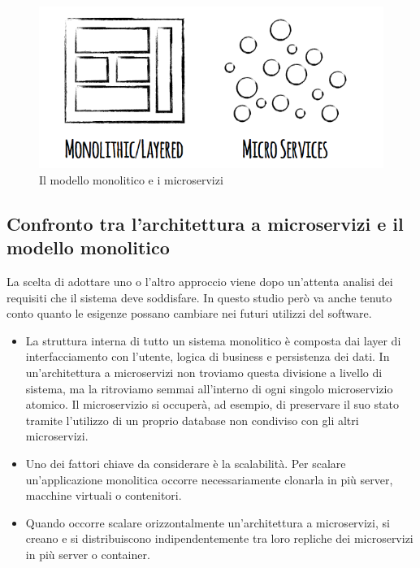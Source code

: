 \begin{figure}[h!]
	\centering
	\includegraphics[width=\textwidth,keepaspectratio=true]{capitoli/imgs/disegnoMicrosMonol.png}
	\caption{Il modello monolitico e i microservizi}
\end{figure}

\subsection{Confronto tra l'architettura a microservizi e il modello monolitico}
La scelta di adottare uno o l'altro approccio viene dopo un'attenta analisi dei requisiti che il sistema deve soddisfare. In questo studio però va anche tenuto conto quanto le esigenze possano cambiare nei futuri utilizzi del software.
\begin{itemize}
	\item La struttura interna di tutto un sistema monolitico è composta dai layer di interfacciamento con l'utente, logica di business e persistenza dei dati. In un'architettura a microservizi non troviamo questa divisione a livello di sistema, ma la ritroviamo semmai all'interno di ogni singolo microservizio atomico. Il microservizio si occuperà, ad esempio, di preservare il suo stato tramite l'utilizzo di un proprio database non condiviso con gli altri microservizi. 
	
	\item Uno dei fattori chiave da considerare è la scalabilità. Per scalare un'applicazione monolitica occorre necessariamente clonarla in più server, macchine virtuali o contenitori.
	
	\item Quando occorre scalare orizzontalmente un'architettura a microservizi, si creano e si distribuiscono indipendentemente tra loro repliche dei microservizi in più server o container. 
\end{itemize}


